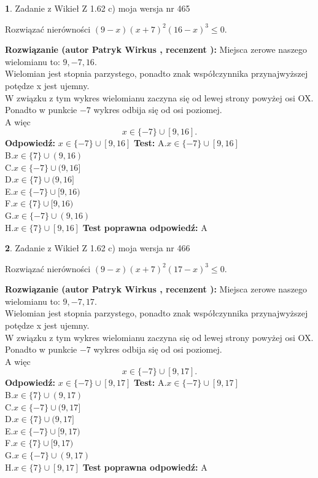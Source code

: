 \documentclass[12pt, a4paper]{article}
\theoremstyle{definition} %
\newtheorem{zad}{}
\newcommand{\zadStart}[1]{\begin{zad}#1\newline}
\newcommand{\zadStop}{\end{zad}}
\newcommand{\rozwStart}[2]{\noindent \textbf{Rozwiązanie (autor #1 , recenzent #2): }\newline}
\newcommand{\rozwStop}{\newline}
\newcommand{\odpStart}{\noindent \textbf{Odpowiedź:}\newline}
\newcommand{\odpStop}{\newline}
\newcommand{\testStart}{\noindent \textbf{Test:}\newline}
\newcommand{\testStop}{\newline}
\newcommand{\kluczStart}{\noindent \textbf{Test poprawna odpowiedź:}\newline}
\newcommand{\kluczStop}{\newline}
\begin{document}
\zadStart{Zadanie z Wikieł Z 1.62 c) moja wersja nr 465}

Rozwiązać nierówności $(9-x)(x+7)^{2}(16-x)^{3}\le0$.
\zadStop
\rozwStart{Patryk Wirkus}{}
Miejsca zerowe naszego wielomianu to: $9, -7, 16$.\\
Wielomian jest stopnia parzystego, ponadto znak współczynnika przy\linebreak najwyższej potędze x jest ujemny.\\ W związku z tym wykres wielomianu zaczyna się od lewej strony powyżej osi OX.\\
Ponadto w punkcie $-7$ wykres odbija się od osi poziomej.\\
A więc $$x \in \{-7\} \cup [9,16].$$
\rozwStop
\odpStart
$x \in \{-7\} \cup [9,16]$
\odpStop
\testStart
A.$x \in \{-7\} \cup [9,16]$\\
B.$x \in \{7\} \cup (9,16)$\\
C.$x \in \{-7\} \cup (9,16]$\\
D.$x \in \{7\} \cup (9,16]$\\
E.$x \in \{-7\} \cup [9,16)$\\
F.$x \in \{7\} \cup [9,16)$\\
G.$x \in \{-7\} \cup (9,16)$\\
H.$x \in \{7\} \cup [9,16]$
\testStop
\kluczStart
A
\kluczStop



\zadStart{Zadanie z Wikieł Z 1.62 c) moja wersja nr 466}

Rozwiązać nierówności $(9-x)(x+7)^{2}(17-x)^{3}\le0$.
\zadStop
\rozwStart{Patryk Wirkus}{}
Miejsca zerowe naszego wielomianu to: $9, -7, 17$.\\
Wielomian jest stopnia parzystego, ponadto znak współczynnika przy\linebreak najwyższej potędze x jest ujemny.\\ W związku z tym wykres wielomianu zaczyna się od lewej strony powyżej osi OX.\\
Ponadto w punkcie $-7$ wykres odbija się od osi poziomej.\\
A więc $$x \in \{-7\} \cup [9,17].$$
\rozwStop
\odpStart
$x \in \{-7\} \cup [9,17]$
\odpStop
\testStart
A.$x \in \{-7\} \cup [9,17]$\\
B.$x \in \{7\} \cup (9,17)$\\
C.$x \in \{-7\} \cup (9,17]$\\
D.$x \in \{7\} \cup (9,17]$\\
E.$x \in \{-7\} \cup [9,17)$\\
F.$x \in \{7\} \cup [9,17)$\\
G.$x \in \{-7\} \cup (9,17)$\\
H.$x \in \{7\} \cup [9,17]$
\testStop
\kluczStart
A
\kluczStop
\end{document}
